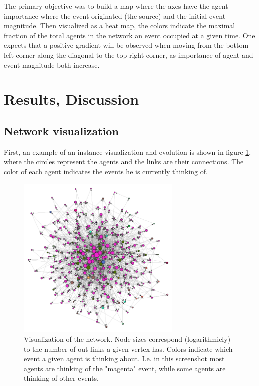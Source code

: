\documentclass [12pt,a4paper,twoside]{article}
\begin{document}
The primary objective was to build a map where the axes have the agent importance where the event originated (the source) and the initial event magnitude. Then visualized as a heat map, the colors indicate the maximal fraction of the total agents in the network an event occupied at a given time. One expects that a positive gradient will be observed when moving from the bottom left corner along the diagonal to the top right corner, as importance of agent and event magnitude both increase.


\section{Results, Discussion}
\subsection{Network visualization}
First, an example of an instance visualization and evolution is shown in figure \ref{screenshot}, where the circles represent the agents and the links are their connections. The color of each agent indicates the events he is currently thinking of.

\begin{figure}[H]
  \centering
  \includegraphics[width=0.7\textwidth]{report/graph}
  \caption{Visualization of the network. Node sizes correspond (logarithmicly) to the number of out-links a given vertex has. Colors indicate which event a given agent is thinking about. I.e. in this screenshot most agents are thinking of the "magenta" event, while some agents are thinking of other events.}
  \label{screenshot}
\end{figure}
\end{document}

